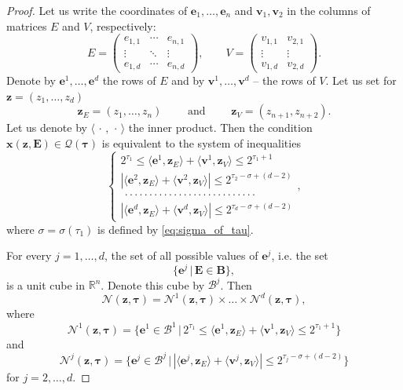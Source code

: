 \documentclass[a4paper,12pt]{article}
\theoremstyle{definition}
\theoremstyle{remark}
\theoremstyle{plain}
\renewcommand{\vec}[1]{\mathbf{#1}}
\renewcommand{\leq}{\leqslant}
\newcommand{\R}{\mathbb{R}}
\newcommand{\cB}{\mathcal{B}}
\newcommand{\cN}{\mathcal{N}}
\newcommand{\cQ}{\mathcal{Q}}
\newcommand{\bB}{\mathbf{B}}
\newcommand{\bE}{\mathbf{E}}
\begin{document}
\begin{proof}
  Let us write the coordinates of $\vec e_1,\ldots,\vec e_n$ and $\vec v_1,\vec v_2$ in the columns of matrices $E$ and $V$, respectively:
  \[
    E=
    \begin{pmatrix}
      e_{1,1} & \cdots & e_{n,1} \\
      \vdots  & \ddots & \vdots \\
      e_{1,d} & \cdots & e_{n,d}
    \end{pmatrix},
    \qquad
    V=
    \begin{pmatrix}
      v_{1,1} & v_{2,1} \\
      \vdots  & \vdots \\
      v_{1,d} & v_{2,d}
    \end{pmatrix}.
  \]
  Denote by $\vec e^1,\ldots,\vec e^d$ the rows of $E$ and by $\vec v^1,\ldots,\vec v^d$ -- the rows of $V$. Let us set for $\vec z=(z_1,\ldots,z_d)$
  \[
    \vec z_E=(z_1,\ldots,z_n)
    \qquad\text{ and }\qquad
    \vec z_V=(z_{n+1},z_{n+2}).
  \]
  Let us denote by $\langle\,\cdot\,,\,\cdot\,\rangle$ the inner product. Then the condition $\vec x(\vec z,\bE)\in\cQ(\pmb\tau)$ is equivalent to the system of inequalities
  \begin{equation}\label{eq:forbidden_set_system}
    \begin{cases}
      2^{\tau_1}\leq\langle\vec e^1,\vec z_E\rangle+\langle\vec v^1,\vec z_V\rangle\leq2^{\tau_1+1} \\
      |\langle\vec e^2,\vec z_E\rangle+\langle\vec v^2,\vec z_V\rangle|\leq2^{\tau_2-\sigma+(d-2)} \\
      \ \cdot\cdot\cdot\cdot\cdot\cdot\cdot\cdot\cdot\cdot\cdot\cdot\cdot\cdot\cdot\cdot\cdot\cdot\cdot\cdot\cdot\cdot\cdot\cdot\cdot\cdot\cdot \\
      |\langle\vec e^d,\vec z_E\rangle+\langle\vec v^d,\vec z_V\rangle|\leq2^{\tau_d-\sigma+(d-2)}
    \end{cases},
  \end{equation}
  where $\sigma=\sigma(\tau_1)$ is defined by \eqref{eq:sigma_of_tau}.
  
  For every $j=1,\ldots,d$, the set of all possible values of $\vec e^j$, i.e. the set
  \[
    \Big\{\vec e^j \,\Big|\, \bE\in\bB \Big\},
  \]
  is a unit cube in $\R^n$. Denote this cube by $\cB^j$. Then
  \[
    \cN(\vec z,\pmb\tau)=
    \cN^1(\vec z,\pmb\tau)\times\ldots\times\cN^d(\vec z,\pmb\tau),
  \]
  where
  \[
    \cN^1(\vec z,\pmb\tau)=
    \Big\{\vec e^1\in\cB^1 \,\Big|\, 2^{\tau_1}\leq\langle\vec e^1,\vec z_E\rangle+\langle\vec v^1,\vec z_V\rangle\leq2^{\tau_1+1} \Big\}
  \]
  and
  \[
    \cN^j(\vec z,\pmb\tau)=
    \Big\{\vec e^j\in\cB^j \,\Big|\, |\langle\vec e^j,\vec z_E\rangle+\langle\vec v^j,\vec z_V\rangle|\leq2^{\tau_j-\sigma+(d-2)} \Big\}
  \]
  for $j=2,\ldots,d$.
  

\end{proof}
\end{document}

